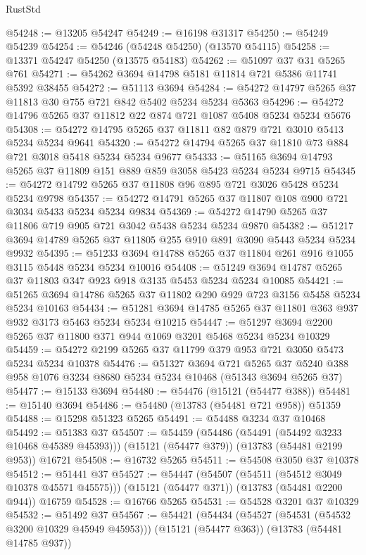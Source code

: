 \begin{lexlean}{RustStd}
\begin{coremodule}
@54248 := @13205 @54247
@54249 := @16198 @31317
@54250 := @54249 @54239
@54254 := @54246 (@54248 @54250) (@13570 @54115)
@54258 := @13371 @54247 @54250 (@13575 @54183)
@54262 := @51097 @37 @31 @5265 @761
@54271 := @54262 @3694 @14798 @5181 @11814 @721 @5386 @11741 @5392 @38455
@54272 := @51113 @3694
@54284 := @54272 @14797 @5265 @37 @11813 @30 @755 @721 @842 @5402 @5234 @5234 @5363
@54296 := @54272 @14796 @5265 @37 @11812 @22 @874 @721 @1087 @5408 @5234 @5234 @5676
@54308 := @54272 @14795 @5265 @37 @11811 @82 @879 @721 @3010 @5413 @5234 @5234 @9641
@54320 := @54272 @14794 @5265 @37 @11810 @73 @884 @721 @3018 @5418 @5234 @5234 @9677
@54333 := @51165 @3694 @14793 @5265 @37 @11809 @151 @889 @859 @3058 @5423 @5234 @5234 @9715
@54345 := @54272 @14792 @5265 @37 @11808 @96 @895 @721 @3026 @5428 @5234 @5234 @9798
@54357 := @54272 @14791 @5265 @37 @11807 @108 @900 @721 @3034 @5433 @5234 @5234 @9834
@54369 := @54272 @14790 @5265 @37 @11806 @719 @905 @721 @3042 @5438 @5234 @5234 @9870
@54382 := @51217 @3694 @14789 @5265 @37 @11805 @255 @910 @891 @3090 @5443 @5234 @5234 @9932
@54395 := @51233 @3694 @14788 @5265 @37 @11804 @261 @916 @1055 @3115 @5448 @5234 @5234 @10016
@54408 := @51249 @3694 @14787 @5265 @37 @11803 @347 @923 @918 @3135 @5453 @5234 @5234 @10085
@54421 := @51265 @3694 @14786 @5265 @37 @11802 @290 @929 @723 @3156 @5458 @5234 @5234 @10163
@54434 := @51281 @3694 @14785 @5265 @37 @11801 @363 @937 @932 @3173 @5463 @5234 @5234 @10215
@54447 := @51297 @3694 @2200 @5265 @37 @11800 @371 @944 @1069 @3201 @5468 @5234 @5234 @10329
@54459 := @54272 @2199 @5265 @37 @11799 @379 @953 @721 @3050 @5473 @5234 @5234 @10378
@54476 := @51327
    @3694
    @721
    @5265
    @37
    @5240
    @388
    @958
    @1076
    @3234
    @8680
    @5234
    @5234
    @10468
    (@51343 @3694 @5265 @37)
@54477 := @15133 @3694
@54480 := @54476 (@15121 (@54477 @388))
@54481 := @15140 @3694
@54486 := @54480 (@13783 (@54481 @721 @958)) @51359
@54488 := @15298 @51323 @5265
@54491 := @54488 @3234 @37 @10468
@54492 := @51383 @37
@54507 := @54459
    (@54486 (@54491 (@54492 @3233 @10468 @45389 @45393)))
    (@15121 (@54477 @379))
    (@13783 (@54481 @2199 @953))
    @16721
@54508 := @16732 @5265
@54511 := @54508 @3050 @37 @10378
@54512 := @51441 @37
@54527 := @54447
    (@54507 (@54511 (@54512 @3049 @10378 @45571 @45575)))
    (@15121 (@54477 @371))
    (@13783 (@54481 @2200 @944))
    @16759
@54528 := @16766 @5265
@54531 := @54528 @3201 @37 @10329
@54532 := @51492 @37
@54567 := @54421
    (@54434
      (@54527 (@54531 (@54532 @3200 @10329 @45949 @45953)))
      (@15121 (@54477 @363))
      (@13783 (@54481 @14785 @937))

\end{coremodule}
\end{lexlean}
